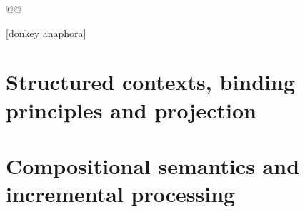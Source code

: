 @@  

[donkey anaphora]

\section{Structured contexts, binding principles and projection}
\label{sec:struc-cntxt}

\section{Compositional semantics and incremental processing}

